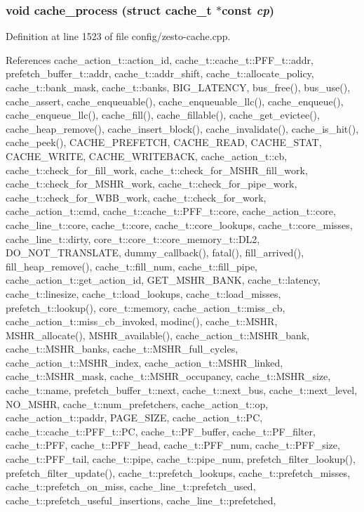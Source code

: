 \subsubsection[{cache\_\-process}]{\setlength{\rightskip}{0pt plus 5cm}void cache\_\-process (struct {\bf cache\_\-t} $\ast$const  {\em cp})}\label{zesto-cache_8h_93ce14ef87e7565964216ea27d912147}




Definition at line 1523 of file config/zesto-cache.cpp.

References cache\_\-action\_\-t::action\_\-id, cache\_\-t::cache\_\-t::PFF\_\-t::addr, prefetch\_\-buffer\_\-t::addr, cache\_\-t::addr\_\-shift, cache\_\-t::allocate\_\-policy, cache\_\-t::bank\_\-mask, cache\_\-t::banks, BIG\_\-LATENCY, bus\_\-free(), bus\_\-use(), cache\_\-assert, cache\_\-enqueuable(), cache\_\-enqueuable\_\-llc(), cache\_\-enqueue(), cache\_\-enqueue\_\-llc(), cache\_\-fill(), cache\_\-fillable(), cache\_\-get\_\-evictee(), cache\_\-heap\_\-remove(), cache\_\-insert\_\-block(), cache\_\-invalidate(), cache\_\-is\_\-hit(), cache\_\-peek(), CACHE\_\-PREFETCH, CACHE\_\-READ, CACHE\_\-STAT, CACHE\_\-WRITE, CACHE\_\-WRITEBACK, cache\_\-action\_\-t::cb, cache\_\-t::check\_\-for\_\-fill\_\-work, cache\_\-t::check\_\-for\_\-MSHR\_\-fill\_\-work, cache\_\-t::check\_\-for\_\-MSHR\_\-work, cache\_\-t::check\_\-for\_\-pipe\_\-work, cache\_\-t::check\_\-for\_\-WBB\_\-work, cache\_\-t::check\_\-for\_\-work, cache\_\-action\_\-t::cmd, cache\_\-t::cache\_\-t::PFF\_\-t::core, cache\_\-action\_\-t::core, cache\_\-line\_\-t::core, cache\_\-t::core, cache\_\-t::core\_\-lookups, cache\_\-t::core\_\-misses, cache\_\-line\_\-t::dirty, core\_\-t::core\_\-t::core\_\-memory\_\-t::DL2, DO\_\-NOT\_\-TRANSLATE, dummy\_\-callback(), fatal(), fill\_\-arrived(), fill\_\-heap\_\-remove(), cache\_\-t::fill\_\-num, cache\_\-t::fill\_\-pipe, cache\_\-action\_\-t::get\_\-action\_\-id, GET\_\-MSHR\_\-BANK, cache\_\-t::latency, cache\_\-t::linesize, cache\_\-t::load\_\-lookups, cache\_\-t::load\_\-misses, prefetch\_\-t::lookup(), core\_\-t::memory, cache\_\-action\_\-t::miss\_\-cb, cache\_\-action\_\-t::miss\_\-cb\_\-invoked, modinc(), cache\_\-t::MSHR, MSHR\_\-allocate(), MSHR\_\-available(), cache\_\-action\_\-t::MSHR\_\-bank, cache\_\-t::MSHR\_\-banks, cache\_\-t::MSHR\_\-full\_\-cycles, cache\_\-action\_\-t::MSHR\_\-index, cache\_\-action\_\-t::MSHR\_\-linked, cache\_\-t::MSHR\_\-mask, cache\_\-t::MSHR\_\-occupancy, cache\_\-t::MSHR\_\-size, cache\_\-t::name, prefetch\_\-buffer\_\-t::next, cache\_\-t::next\_\-bus, cache\_\-t::next\_\-level, NO\_\-MSHR, cache\_\-t::num\_\-prefetchers, cache\_\-action\_\-t::op, cache\_\-action\_\-t::paddr, PAGE\_\-SIZE, cache\_\-action\_\-t::PC, cache\_\-t::cache\_\-t::PFF\_\-t::PC, cache\_\-t::PF\_\-buffer, cache\_\-t::PF\_\-filter, cache\_\-t::PFF, cache\_\-t::PFF\_\-head, cache\_\-t::PFF\_\-num, cache\_\-t::PFF\_\-size, cache\_\-t::PFF\_\-tail, cache\_\-t::pipe, cache\_\-t::pipe\_\-num, prefetch\_\-filter\_\-lookup(), prefetch\_\-filter\_\-update(), cache\_\-t::prefetch\_\-lookups, cache\_\-t::prefetch\_\-misses, cache\_\-t::prefetch\_\-on\_\-miss, cache\_\-line\_\-t::prefetch\_\-used, cache\_\-t::prefetch\_\-useful\_\-insertions, cache\_\-line\_\-t::prefetched, 